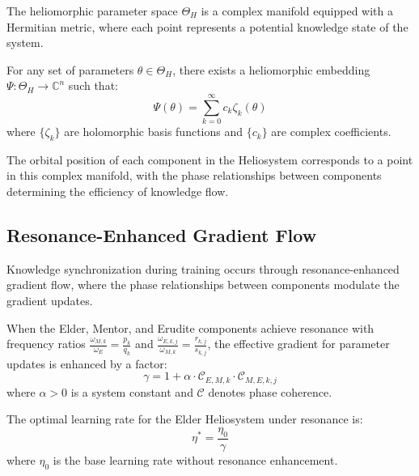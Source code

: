 \begin{definition}
The heliomorphic parameter space $\Theta_H$ is a complex manifold equipped with a Hermitian metric, where each point represents a potential knowledge state of the system.
\end{definition}

\begin{theorem}
For any set of parameters $\theta \in \Theta_H$, there exists a heliomorphic embedding $\Psi: \Theta_H \rightarrow \mathbb{C}^n$ such that:
\begin{equation}
\Psi(\theta) = \sum_{k=0}^{\infty} c_k \zeta_k(\theta)
\end{equation}
where $\{\zeta_k\}$ are holomorphic basis functions and $\{c_k\}$ are complex coefficients.
\end{theorem}

The orbital position of each component in the Heliosystem corresponds to a point in this complex manifold, with the phase relationships between components determining the efficiency of knowledge flow.

\subsection{Resonance-Enhanced Gradient Flow}

Knowledge synchronization during training occurs through resonance-enhanced gradient flow, where the phase relationships between components modulate the gradient updates.

\begin{theorem}
When the Elder, Mentor, and Erudite components achieve resonance with frequency ratios $\frac{\omega_{M,k}}{\omega_E} = \frac{p_k}{q_k}$ and $\frac{\omega_{E,k,j}}{\omega_{M,k}} = \frac{r_{k,j}}{s_{k,j}}$, the effective gradient for parameter updates is enhanced by a factor:
\begin{equation}
\gamma = 1 + \alpha \cdot \mathcal{C}_{E,M,k} \cdot \mathcal{C}_{M,E,k,j}
\end{equation}
where $\alpha > 0$ is a system constant and $\mathcal{C}$ denotes phase coherence.
\end{theorem}

\begin{corollary}
The optimal learning rate for the Elder Heliosystem under resonance is:
\begin{equation}
\eta^* = \frac{\eta_0}{\gamma}
\end{equation}
where $\eta_0$ is the base learning rate without resonance enhancement.
\end{corollary}

